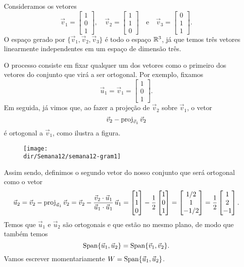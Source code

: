 \documentclass[../livro.tex]{subfiles}  %
\providecommand{\dir}{..}
\begin{document}
\begin{example}
Consideramos os vetores
\[
\vec{v}_1 =
\begin{bmatrix}
1 \\ 0 \\ 1
\end{bmatrix}, \quad
\vec{v}_2 =
\begin{bmatrix}
1 \\ 1 \\ 0
\end{bmatrix} \quad \text{e} \quad
\vec{v}_3 =
\begin{bmatrix}
0 \\ 1 \\ 1
\end{bmatrix}.
\] O espaço gerado por $\{\vec{v}_1, \vec{v}_2, \vec{v}_3 \}$ é todo o espaço $\mathbb{R}^3$, já que temos três vetores  linearmente independentes em um espaço de dimensão três.

O processo consiste em fixar qualquer um dos vetores como o primeiro dos vetores do conjunto que virá a ser ortogonal. Por exemplo, fixamos
\[
\vec{u}_1 = \vec{v}_1 =
\begin{bmatrix}
1 \\ 0 \\ 1
\end{bmatrix}.
\] Em seguida, já vimos que, ao fazer a projeção de $\vec{v}_2$ sobre $\vec{v}_1$, o vetor
\[
\vec{v}_2 - \operatorname{proj}_{\vec{v}_1} \vec{v}_2
\] é ortogonal a $\vec{v}_1$, como ilustra a figura.
\begin{figure}[h!]
\begin{center}
\texttt{[image: \\dir/Semana12/semana12-gram1]}
\end{center}
\end{figure}

\noindent Assim sendo, definimos o segundo vetor do nosso conjunto que será ortogonal como o vetor
\[
\vec{u}_2 = \vec{v}_2 - \operatorname{proj}_{\vec{u}_1} \vec{v}_2 = \vec{v}_2 - \frac{\vec{v}_2 \cdot \vec{u}_1}{\vec{u}_1 \cdot \vec{u}_1} \, \vec{u}_1 =
\begin{bmatrix}
1 \\ 1 \\ 0
\end{bmatrix}
- \frac{1}{2}
\begin{bmatrix}
1 \\ 0 \\ 1
\end{bmatrix} =
\begin{bmatrix}
1/2 \\ 1 \\ -1/2
\end{bmatrix} = \frac{1}{2}
\begin{bmatrix}
1 \\ 2 \\ -1
\end{bmatrix}.
\] Temos que $\vec{u}_1$ e $\vec{u}_2$ são ortogonais e que estão no mesmo plano, de modo que também temos
\[
\operatorname{Span} \{ \vec{u}_1, \vec{u}_2 \} = \operatorname{Span} \{ \vec{v}_1, \vec{v}_2 \}.
\] Vamos escrever momentariamente $W = \operatorname{Span} \{ \vec{u}_1, \vec{u}_2 \}$.


\end{example}
\end{document}
